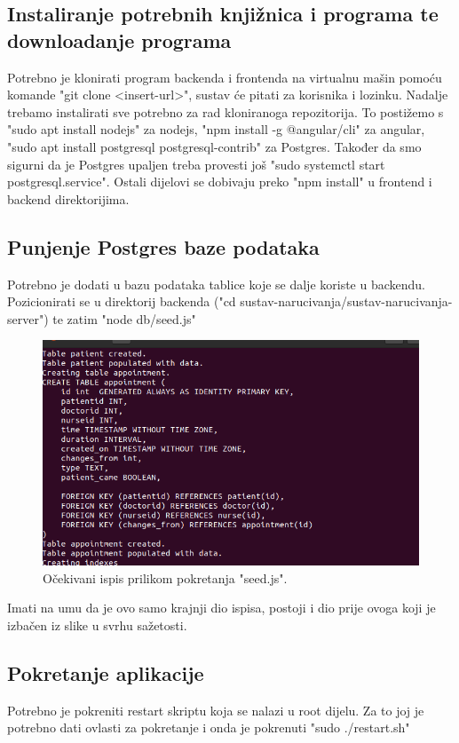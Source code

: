     \subsection{Instaliranje potrebnih knjižnica i programa te downloadanje programa}
    Potrebno je klonirati program backenda i frontenda na virtualnu mašin pomoću komande "git clone <insert-url>", sustav će pitati za korisnika i lozinku. Nadalje trebamo instalirati sve potrebno za rad kloniranoga repozitorija. To postižemo s "sudo apt install nodejs" za nodejs, "npm install -g @angular/cli" za angular, "sudo apt install postgresql postgresql-contrib" za Postgres. Također da smo sigurni da je Postgres upaljen treba provesti još "sudo systemctl start postgresql.service". Ostali dijelovi se dobivaju preko "npm install" u frontend i backend direktorijima.

    \subsection{Punjenje Postgres baze podataka}
    Potrebno je dodati u bazu podataka tablice koje se dalje koriste u backendu. Pozicionirati se u direktorij backenda ("cd sustav-narucivanja/sustav-narucivanja-server") te zatim "node db/seed.js"
    \begin{figure}[H]
        \includegraphics[width=\textwidth]{slike/deploy/seed.png} %
        \caption{Očekivani ispis prilikom pokretanja "seed.js".}
        \label{fig:struktura} %
    \end{figure}
     Imati na umu da je ovo samo krajnji dio ispisa, postoji i dio prije ovoga koji je izbačen iz slike u svrhu sažetosti.

    \subsection{Pokretanje aplikacije}
    Potrebno je pokreniti restart skriptu koja se nalazi u root dijelu. Za to joj je potrebno dati ovlasti za pokretanje i onda je pokrenuti "sudo ./restart.sh"
			

			
			\eject 